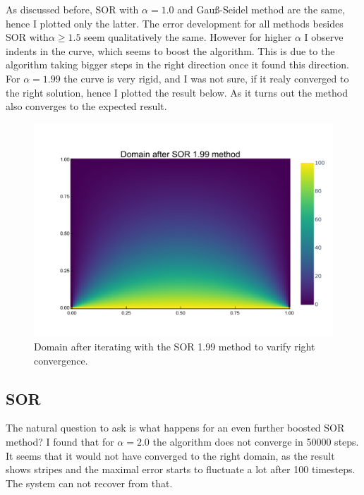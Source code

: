 \documentclass[
	a4paper, %
	10pt, %
]{CSUniSchoolLabReport}
\begin{document}
As discussed before, SOR with $\alpha=1.0$ and Gauß-Seidel method are the same, hence I plotted only the latter. The error development for all methods besides SOR with$\alpha\geq 1.5$ seem qualitatively the same. However for higher $\alpha$ I observe indents in the curve, which seems to boost the algorithm. This is due to the algorithm taking bigger steps in the right direction once it found this direction. 
For $\alpha=1.99$ the curve is very rigid, and I was not sure, if it realy converged to the right solution, hence I plotted the result below. As it turns out the method also converges to the expected result.

\begin{figure}[H]
	\includegraphics[width=\textwidth]{../saves_t1/sor199_heatmap.pdf}
	\caption{Domain after iterating with the SOR 1.99 method to varify right convergence.}
\end{figure}

\subsection{SOR}

The natural question to ask is what happens for an even further boosted SOR method? I found that for $\alpha = 2.0$ the algorithm does not converge in  50000 steps. It seems that it would not have converged to the right domain, as the result shows stripes and the maximal error starts to fluctuate a lot after 100 timesteps. The system can not recover from that.
\end{document}
